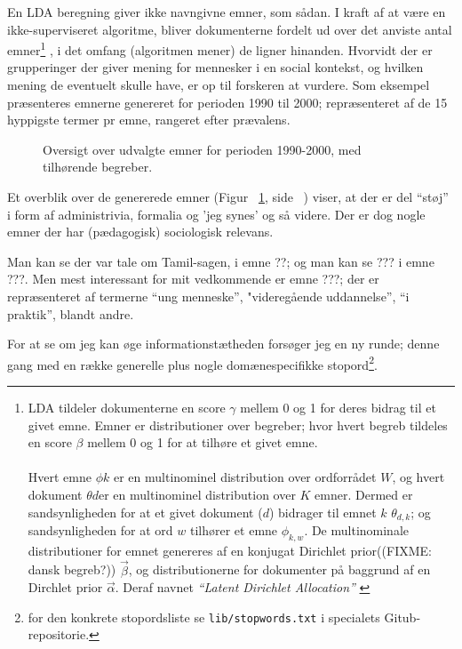 En LDA beregning giver ikke navngivne emner, som sådan.
I kraft af at være en ikke-superviseret algoritme, bliver dokumenterne fordelt ud over det anviste antal emner\footnote{LDA tildeler dokumenterne en score $\gamma$ mellem 0 og 1 for deres bidrag til et givet emne. Emner er distributioner over begreber; hvor hvert begreb tildeles en score $\beta$ mellem 0 og 1 for at tilhøre et givet emne. \\ \\ Hvert emne $\phi k$ er en multinominel distribution over ordforrådet $W$, og hvert dokument $\theta  d$er en multinominel distribution over $K$ emner. Dermed er sandsynligheden for at et givet dokument ($d$) bidrager til emnet $k$ $\theta _{d,k}$; og sandsynligheden for at ord $w$ tilhører et emne $\phi _{k,w}$. De multinominale distributioner for emnet genereres af en konjugat Dirichlet prior((FIXME: dansk begreb?)) $\overrightarrow{\beta}$, og distributionerne for dokumenter på baggrund af en Dirchlet prior $\overrightarrow{\alpha}$. Deraf navnet \textit{“Latent Dirichlet Allocation”} \autocite[s.65f]{deveaudAccurateEffectiveLatent2014}} , i det omfang (algoritmen mener) de ligner hinanden.
Hvorvidt der er grupperinger der giver mening for mennesker i en social kontekst, og hvilken mening de eventuelt skulle have, er op til forskeren at vurdere.
Som eksempel præsenteres emnerne genereret for perioden 1990 til 2000; repræsenteret af de 15 hyppigste termer pr emne, rangeret efter prævalens.

\begin{figure}
\begin{adjustwidth}{-1in}{-1in}
  
\end{adjustwidth}
\caption{Oversigt over udvalgte emner for perioden 1990-2000, med tilhørende begreber.}
\label{fig:termsFull}
\end{figure}

Et overblik over de genererede emner (Figur ~\ref{fig:termsFull}, side ~\pageref{fig:termsFull}) viser, at der er del “støj” i form af administrivia, formalia og 'jeg synes' og så videre.
Der er dog nogle emner der har (pædagogisk) sociologisk relevans.

Man kan se der var tale om Tamil-sagen, i emne ??; og man kan se ??? i emne ???.
Men mest interessant for mit vedkommende er emne ???; der er repræsenteret af termerne “ung menneske”, "videregående uddannelse”, “i praktik”, blandt andre.

For at se om jeg kan øge informationstætheden forsøger jeg en ny runde; denne gang med en række generelle \autocite{stopwords-isoStopwordsISO2020} plus nogle domænespecifikke stopord\footnote{for den konkrete stopordsliste se \texttt{lib/stopwords.txt} i specialets Gitub-repositorie.}.

